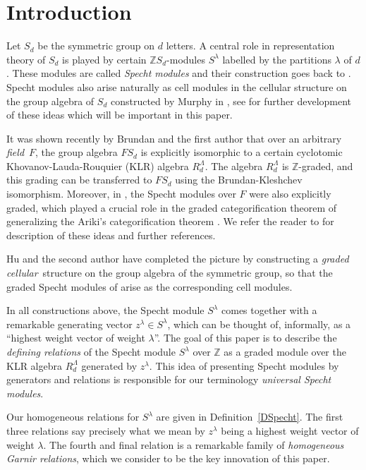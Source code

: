 \documentclass[twoside,11pt,reqno]{amsart}
\numberwithin{equation}{section}
\theoremstyle{definition}  %
\newcommand{\Z}{\mathbb{Z}}
\newcommand{\0}{{\bar 0}}
\newcommand{\1}{{\bar 1}}
\newcommand{\la}{\lambda}
\begin{document}
\maketitle

\section{Introduction}
Let $S_d$ be the symmetric group on $d$ letters. A central role in representation theory of $S_d$ is played by certain $\Z S_d$-modules $S^\la$ labelled by the partitions $\la$ of $d$. These modules are called {\em Specht modules} and their  construction goes back to \cite{Young1,Young2,Specht}. Specht modules also arise naturally as cell modules in the cellular structure on the group algebra of $S_d$ constructed by Murphy in \cite{Murphy}, see \cite{MathasB,DJM,JM} for further development of these ideas which will be important in this paper. 

It was shown recently by Brundan and the first author \cite{BK} that over an arbitrary {\em  field}\, $F$, the group algebra $FS_d$ is explicitly isomorphic to a certain cyclotomic Khovanov-Lauda-Rouquier (KLR) algebra $R^\Lambda_d$. The algebra $R^\Lambda_d$  is $\Z$-graded, and this grading can be transferred to $FS_d$ using the Brundan-Kleshchev isomorphism. Moreover, in \cite{BKW}, the Specht modules over $F$ were also explicitly graded, which played a crucial role in the graded categorification theorem of \cite{BKllt} generalizing the Ariki's categorification theorem \cite{Ariki}. We refer the reader to \cite{Kbull} for description of these ideas and further references. 

Hu and the second author \cite{HM} have completed the picture by constructing a {\em graded cellular}\, structure on the group algebra of the symmetric group, so that the graded Specht modules of \cite{BKW} arise as the corresponding cell modules. 

In all constructions above, the Specht
module $S^\la$ comes together with a remarkable generating vector $z^\la\in S^\la$, which can be
thought of, informally, as a ``highest weight vector of weight $\la$''. The goal of this paper is to describe the {\em defining relations} of the Specht module $S^\la$
over $\Z$ as a graded module over the KLR algebra $R^\Lambda_d$ generated by $z^\la$. This idea of presenting Specht modules by generators and relations is responsible for our terminology {\em universal Specht modules}. 

Our homogeneous relations for $S^\lambda$ are given in Definition~\ref{DSpecht}. The first
three relations say precisely what we mean by $z^\lambda$ being a highest weight vector of
weight $\la$. The fourth and final relation is a remarkable family of {\em homogeneous Garnir
relations}, which we consider to be the key innovation of this paper. 
\end{document}
